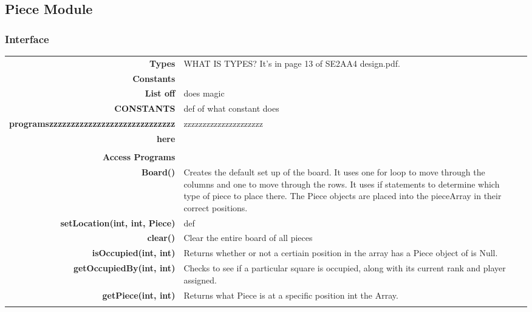 \documentclass[10pt]{article}
\makeatletter
\newcommand{\CustomLabel}[1]{\Hy@raisedlink{\hypertarget{#1}{}}\label{#1}}
\makeatother
\begin{document}
        
        
        
        
    \subsection{Piece Module}\CustomLabel{mis:Piece}
    \subsubsection{Interface}
        \begin{tabularx}{\linewidth}{@{} >{\bfseries}r Xp{5cm} }
            Types           & WHAT IS TYPES? It's in page 13 of SE2AA4 design.pdf. \\
            
            Constants       & \begin{tabular}[t]{@{} l p{8cm}} 
                                     & \\
                                    List off & does magic \\
                                    CONSTANTS & def of what constant does \\
                                    programszzzzzzzzzzzzzzzzzzzzzzzzzzzzz & zzzzzzzzzzzzzzzzzzzzz \\
                                    here & \\ 
                              \end{tabular} \\

            Access Programs & \begin{tabular}[t]{@{} l p{8cm}}
                                     & \\
                                    Board() & Creates the default set up of the board. It uses one for loop to move through the columns and one to move through the rows. It uses if statements to determine which type of piece to place there. The Piece objects are placed into the pieceArray in their correct positions.\\
                                    setLocation(int, int, Piece) & def \\
                                    clear() & Clear the entire board of all pieces \\
                                    isOccupied(int, int) & Returns whether or not a certiain position in the array has a Piece object of is Null. \\ 
                                    getOccupiedBy(int, int) & Checks to see if a particular square is occupied, along with its current rank and player assigned. \\
                                    getPiece(int, int) & Returns what Piece is at a specific position int the Array. \\
                              \end{tabular}
        \end{tabularx}
        
\end{document}
